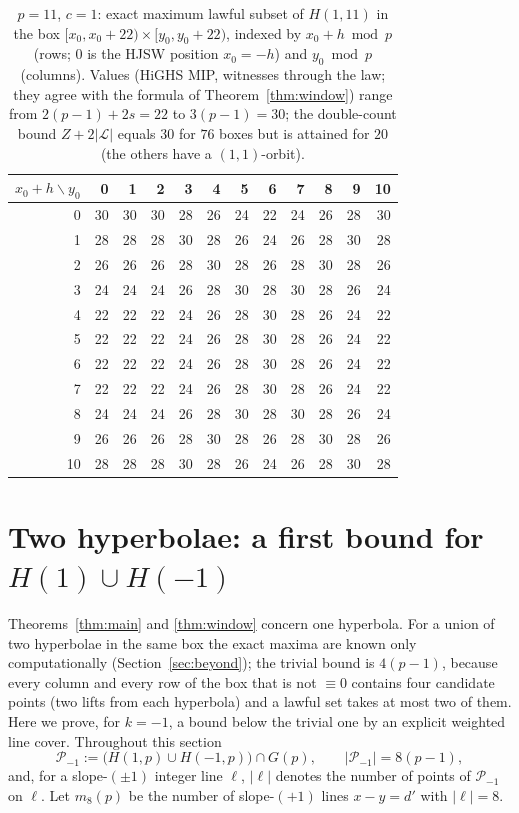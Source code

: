 \documentclass[11pt]{article}
\theoremstyle{remark}
\newcommand{\Gp}{G(p)}
\newcommand{\Lc}{\mathcal{L}}
\newcommand{\Pset}{\mathcal{P}}
\begin{document}
\begin{table}[h]\centering\footnotesize
\begin{tabular}{r|rrrrrrrrrrr}
\toprule
$x_0+h\backslash y_0$ & 0 & 1 & 2 & 3 & 4 & 5 & 6 & 7 & 8 & 9 & 10\\
\midrule
0 & 30&30&30&28&26&24&22&24&26&28&30\\
1 & 28&28&28&30&28&26&24&26&28&30&28\\
2 & 26&26&26&28&30&28&26&28&30&28&26\\
3 & 24&24&24&26&28&30&28&30&28&26&24\\
4 & 22&22&22&24&26&28&30&28&26&24&22\\
5 & 22&22&22&24&26&28&30&28&26&24&22\\
6 & 22&22&22&24&26&28&30&28&26&24&22\\
7 & 22&22&22&24&26&28&30&28&26&24&22\\
8 & 24&24&24&26&28&30&28&30&28&26&24\\
9 & 26&26&26&28&30&28&26&28&30&28&26\\
10 & 28&28&28&30&28&26&24&26&28&30&28\\
\bottomrule
\end{tabular}
\caption{$p=11$, $c=1$: exact maximum lawful subset of $H(1,11)$ in the box $[x_0,x_0+22)\times[y_0,y_0+22)$, indexed by
$x_0+h\bmod p$ (rows; $0$ is the HJSW position $x_0=-h$) and $y_0\bmod p$ (columns).  Values (HiGHS MIP, witnesses through the law; they agree
with the formula of Theorem~\ref{thm:window}) range from $2(p-1)+2s=22$ to $3(p-1)=30$; the double-count bound $Z+2|\Lc|$
equals $30$ for $76$ boxes but is attained for $20$ (the others have a $(1,1)$-orbit).}
\label{tab:shifts}
\end{table}



\section{Two hyperbolae: a first bound for $H(1)\cup H(-1)$}\label{sec:two}

Theorems~\ref{thm:main} and \ref{thm:window} concern one hyperbola.  For a union of two hyperbolae in the same box the exact maxima
are known only computationally (Section~\ref{sec:beyond}); the trivial bound is $4(p-1)$, because every column and every row of the
box that is not $\equiv0$ contains four candidate points (two lifts from each hyperbola) and a lawful set takes at most two of them.
Here we prove, for $k=-1$, a bound below the trivial one by an explicit weighted line cover.  Throughout this section
\[
 \Pset_{-1}:=\bigl(H(1,p)\cup H(-1,p)\bigr)\cap\Gp,\qquad |\Pset_{-1}|=8(p-1),
\]
and, for a slope-$(\pm1)$ integer line $\ell$, $|\ell|$ denotes the number of points of $\Pset_{-1}$ on $\ell$.  Let $m_8(p)$ be the
number of slope-$(+1)$ lines $x-y=d'$ with $|\ell|=8$.
\end{document}
